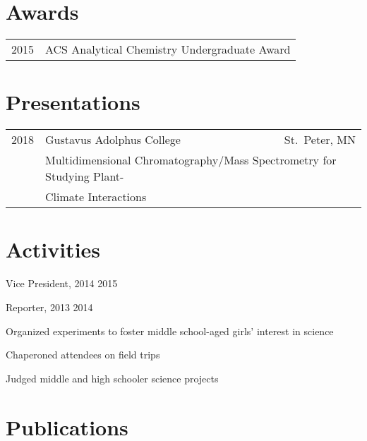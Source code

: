 \documentclass[]{deedy-resume-openfont}
\begin{document}
\newpage
\begin{minipage}[t]{0.7\textwidth}

\section{Awards}
\begin{tabular}{rl}
2015	     & ACS Analytical Chemistry Undergraduate Award\\
\end{tabular}
\sectionsep

\section{Presentations}
\begin{tabular}{rlr}
2018    & Gustavus Adolphus College & St.\ Peter, MN \\
& \multicolumn{2}{l}{Multidimensional Chromatography/Mass Spectrometry for
    Studying Plant-}\\
& \multicolumn{2}{l}{Climate Interactions}\\
\end{tabular}
\sectionsep

\section{Activities}
\vspace{\topsep}
\begin{tightemize}
\item Vice President, 2014 \textendash{} 2015
\item Reporter, 2013 \textendash{} 2014
\end{tightemize}

\begin{tightemize}
\item Organized experiments to foster middle school-aged girls' interest in
science
\item Chaperoned attendees on field trips
\end{tightemize}

\begin{tightemize}
\item Judged middle and high schooler science projects
\end{tightemize}

\section{Publications} 
\renewcommand\refname{\vskip -1.5em} %


\nocite{*}

\end{minipage}
\hfill
\end{document}

